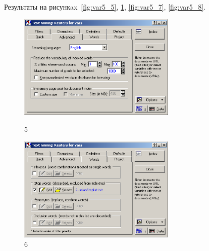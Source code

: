 Результаты на рисункax~\ref{fig:var5_5}, \ref{fig:var5_6}, \ref{fig:var5_7}, \ref{fig:var5_8}.

\begin{figure}[!h]
  \centering

  \begin{minipage}{0.49\textwidth}
    \centering

    \includegraphics[height=5cm]
    {inc/var5/5.PNG}

    \caption{5}

    \label{fig:var5_5}
  \end{minipage}
  \begin{minipage}{0.49\textwidth}
    \centering

    \includegraphics[height=5cm]
    {inc/var5/6.PNG}

    \caption{6}

    \label{fig:var5_6}
  \end{minipage}
\end{figure}

